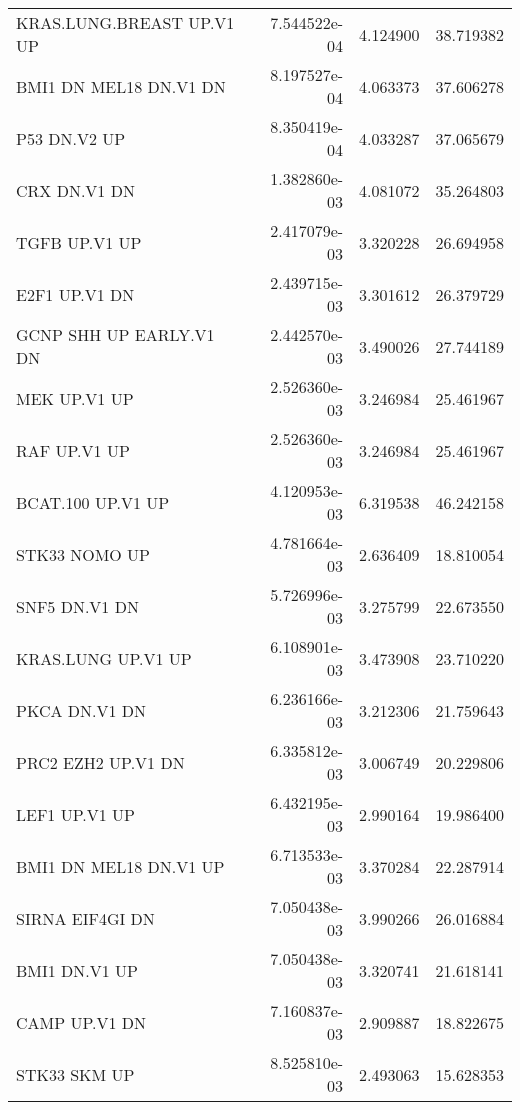 \begin{tabular}{lrrr}
         KRAS.LUNG.BREAST UP.V1 UP &      7.544522e-04 &  4.124900 &       38.719382 \\
            BMI1 DN MEL18 DN.V1 DN &      8.197527e-04 &  4.063373 &       37.606278 \\
                      P53 DN.V2 UP &      8.350419e-04 &  4.033287 &       37.065679 \\
                      CRX DN.V1 DN &      1.382860e-03 &  4.081072 &       35.264803 \\
                     TGFB UP.V1 UP &      2.417079e-03 &  3.320228 &       26.694958 \\
                     E2F1 UP.V1 DN &      2.439715e-03 &  3.301612 &       26.379729 \\
           GCNP SHH UP EARLY.V1 DN &      2.442570e-03 &  3.490026 &       27.744189 \\
                      MEK UP.V1 UP &      2.526360e-03 &  3.246984 &       25.461967 \\
                      RAF UP.V1 UP &      2.526360e-03 &  3.246984 &       25.461967 \\
                 BCAT.100 UP.V1 UP &      4.120953e-03 &  6.319538 &       46.242158 \\
                     STK33 NOMO UP &      4.781664e-03 &  2.636409 &       18.810054 \\
                     SNF5 DN.V1 DN &      5.726996e-03 &  3.275799 &       22.673550 \\
                KRAS.LUNG UP.V1 UP &      6.108901e-03 &  3.473908 &       23.710220 \\
                     PKCA DN.V1 DN &      6.236166e-03 &  3.212306 &       21.759643 \\
                PRC2 EZH2 UP.V1 DN &      6.335812e-03 &  3.006749 &       20.229806 \\
                     LEF1 UP.V1 UP &      6.432195e-03 &  2.990164 &       19.986400 \\
            BMI1 DN MEL18 DN.V1 UP &      6.713533e-03 &  3.370284 &       22.287914 \\
                   SIRNA EIF4GI DN &      7.050438e-03 &  3.990266 &       26.016884 \\
                     BMI1 DN.V1 UP &      7.050438e-03 &  3.320741 &       21.618141 \\
                     CAMP UP.V1 DN &      7.160837e-03 &  2.909887 &       18.822675 \\
                      STK33 SKM UP &      8.525810e-03 &  2.493063 &       15.628353 \\

\end{tabular}
